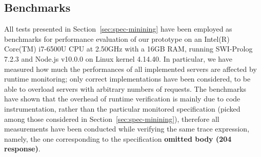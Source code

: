 \subsection{Benchmarks}
All tests presented in Section~\ref{sec:spec-minining} have been employed as benchmarks for performance evaluation
of our prototype on an Intel(R) Core(TM) i7-6500U CPU at 2.50GHz with a 16GB RAM, running SWI-Prolog 7.2.3 and Node.js v10.0.0 on
Linux kernel 4.14.40.
In particular, we have measured how much the performances of all implemented servers are affected by runtime monitoring;
only correct implementations have been considered, to be able to overload servers with arbitrary numbers of requests.
The benchmarks have shown that the overhead of runtime verification is mainly due to code instrumentation, rather than the particular monitored
specification (picked among those considered in Section~\ref{sec:spec-minining}), therefore all measurements have been conducted while verifying the same trace expression, namely,
the one corresponding to the specification \textbf{omitted body (204 response)}.

